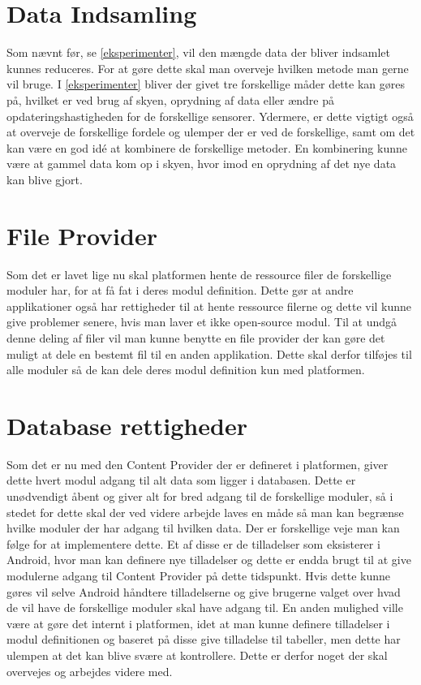\section{Data Indsamling}
Som nævnt før, se \cref{eksperimenter}, vil den mængde data der bliver indsamlet kunnes reduceres.
For at gøre dette skal man overveje hvilken metode man gerne vil bruge.
I \cref{eksperimenter} bliver der givet tre forskellige måder dette kan gøres på, hvilket er ved brug af skyen, oprydning af data eller ændre på opdateringshastigheden for de forskellige sensorer.
Ydermere, er dette vigtigt også at overveje de forskellige fordele og ulemper der er ved de forskellige, samt om det kan være en god idé at kombinere de forskellige metoder.
En kombinering kunne være at gammel data kom op i skyen, hvor imod en oprydning af det nye data kan blive gjort.

\section{File Provider}
Som det er lavet lige nu skal platformen hente de ressource filer de forskellige moduler har, for at få fat i deres modul definition.
Dette gør at andre applikationer også har rettigheder til at hente ressource filerne og dette vil kunne give problemer senere, hvis man laver et ikke open-source modul.
Til at undgå denne deling af filer vil man kunne benytte en file provider der kan gøre det muligt at dele en bestemt fil til en anden applikation.
Dette skal derfor tilføjes til alle moduler så de kan dele deres modul definition kun med platformen. 

\section{Database rettigheder}
Som det er nu med den Content Provider der er defineret i platformen, giver dette hvert modul adgang til alt data som ligger i databasen.
Dette er unødvendigt åbent og giver alt for bred adgang til de forskellige moduler, så i stedet for dette skal der ved videre arbejde laves en måde så man kan begrænse hvilke moduler der har adgang til hvilken data.
Der er forskellige veje man kan følge for at implementere dette.  
Et af disse er de tilladelser som eksisterer i Android, hvor man kan definere nye tilladelser og dette er endda brugt til at give modulerne adgang til Content Provider på dette tidspunkt.
Hvis dette kunne gøres vil selve Android håndtere tilladelserne og give brugerne valget over hvad de vil have de forskellige moduler skal have adgang til.
En anden mulighed ville være at gøre det internt i platformen, idet at man kunne definere tilladelser i modul definitionen og baseret på disse give tilladelse til tabeller, men dette har ulempen at det kan blive svære at kontrollere. 
Dette er derfor noget der skal overvejes og arbejdes videre med. 

